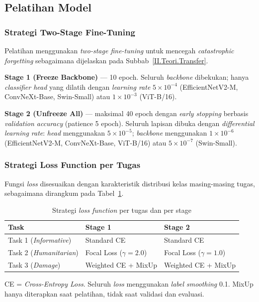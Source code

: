 \subsection{Pelatihan Model} \label{III.Langkah5}

\subsubsection{Strategi Two-Stage Fine-Tuning}
Pelatihan menggunakan \textit{two-stage fine-tuning} untuk mencegah
\textit{catastrophic forgetting} sebagaimana dijelaskan pada
Subbab~\ref{II.Teori.Transfer}. \par

\textbf{Stage 1 (Freeze Backbone)} — 10 epoch. Seluruh \textit{backbone}
dibekukan; hanya \textit{classifier head} yang dilatih dengan
\textit{learning rate} $5 \times 10^{-4}$ (EfficientNetV2-M,
ConvNeXt-Base, Swin-Small) atau $1 \times 10^{-3}$ (ViT-B/16). \par

\textbf{Stage 2 (Unfreeze All)} — maksimal 40 epoch dengan
\textit{early stopping} berbasis \textit{validation accuracy} (patience
5 epoch). Seluruh lapisan dibuka dengan \textit{differential learning
rate}: \textit{head} menggunakan $5 \times 10^{-5}$; \textit{backbone}
menggunakan $1 \times 10^{-6}$ (EfficientNetV2-M, ConvNeXt-Base,
ViT-B/16) atau $5 \times 10^{-7}$ (Swin-Small). \par

\subsubsection{Strategi Loss Function per Tugas}
Fungsi \textit{loss} disesuaikan dengan karakteristik distribusi kelas
masing-masing tugas, sebagaimana dirangkum pada
Tabel~\ref{table:loss_strategy}. \par

\begin{table}[h]
    \centering
    \caption{Strategi \textit{loss function} per tugas dan per stage}
    \label{table:loss_strategy}
    \begin{tabular}{|l|l|l|}
        \hline
        \textbf{Task} & \textbf{Stage 1} & \textbf{Stage 2} \\
        \hline
        Task 1 (\textit{Informative})  & Standard CE & Standard CE \\
        Task 2 (\textit{Humanitarian}) & Focal Loss ($\gamma=2.0$) & Focal Loss ($\gamma=1.0$) \\
        Task 3 (\textit{Damage})       & Weighted CE + MixUp & Weighted CE + MixUp \\
        \hline
    \end{tabular}
    \begin{flushleft}
        \footnotesize{CE = \textit{Cross-Entropy Loss}. Seluruh
        \textit{loss} menggunakan \textit{label smoothing} 0.1.
        MixUp hanya diterapkan saat pelatihan, tidak saat validasi
        dan evaluasi.}
    \end{flushleft}
\end{table}

